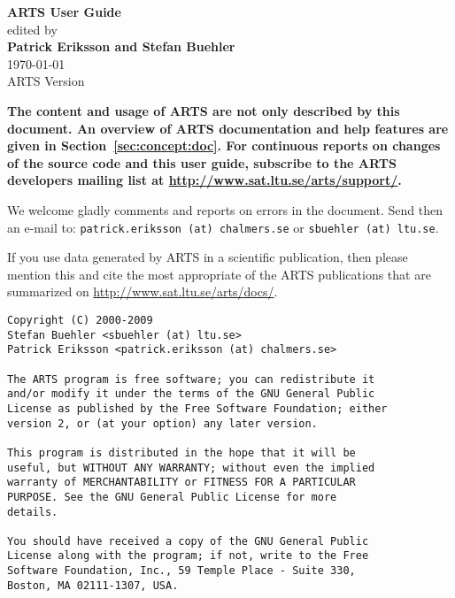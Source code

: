 \documentclass[11pt,twoside,a4paper,fleqn]{book}
\begin{document}
%
\renewcommand{\thepage}{title \arabic{page}} 

\thispagestyle{plain}
\begin{center}
  \vspace*{1cm}
  {\Huge \bf ARTS User Guide\\}
  \vspace*{1cm}
  {\large edited by \\}
  \vspace*{1cm}
  {\Large \bf Patrick Eriksson and Stefan Buehler }\\
   \vspace*{2cm}
   {\large \today\\
    ARTS Version 
   }
\end{center}
\vspace*{\fill}
{\normalsize \bf
  \noindent
  The content and usage of ARTS are not only described by this
  document. An overview of ARTS documentation and help features are
  given in Section~\ref{sec:concept:doc}. For continuous reports on
  changes of the source code and this user guide, subscribe to the
  ARTS developers mailing list at \url{http://www.sat.ltu.se/arts/support/}.

  We welcome gladly comments and reports on errors in the document.
  Send then an e-mail to: \verb|patrick.eriksson (at) chalmers.se| or 
  \verb|sbuehler (at) ltu.se|.

  If you use data generated by ARTS in a scientific
  publication, then please mention this and cite the most
  appropriate of the ARTS publications that are summarized on
  \url{http://www.sat.ltu.se/arts/docs/}.
}

\newpage                          
\thispagestyle{empty}
\vspace*{\fill}
\noindent
\begin{verbatim}
Copyright (C) 2000-2009
Stefan Buehler <sbuehler (at) ltu.se>
Patrick Eriksson <patrick.eriksson (at) chalmers.se>

The ARTS program is free software; you can redistribute it
and/or modify it under the terms of the GNU General Public
License as published by the Free Software Foundation; either
version 2, or (at your option) any later version.

This program is distributed in the hope that it will be
useful, but WITHOUT ANY WARRANTY; without even the implied
warranty of MERCHANTABILITY or FITNESS FOR A PARTICULAR
PURPOSE. See the GNU General Public License for more
details. 

You should have received a copy of the GNU General Public
License along with the program; if not, write to the Free
Software Foundation, Inc., 59 Temple Place - Suite 330,
Boston, MA 02111-1307, USA. 
\end{verbatim}
\end{document}
